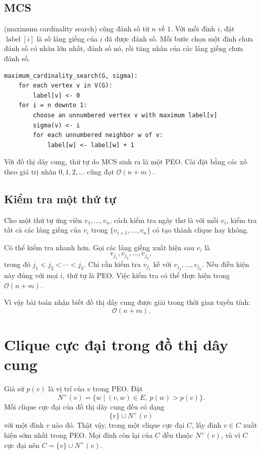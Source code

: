 \documentclass[11pt]{article}
\newcommand{\Oh}{\mathcal{O}}
\begin{document}
\subsection{MCS}

 (maximum cardinality search) cũng đánh số từ \(n\) về \(1\). Với
mỗi đỉnh \(i\), đặt \(\operatorname{label}[i]\) là số láng giềng của \(i\) đã
được đánh số. Mỗi bước chọn một đỉnh chưa đánh số có nhãn lớn nhất, đánh số
nó, rồi tăng nhãn của các láng giềng chưa đánh số.

\begin{verbatim}
maximum_cardinality_search(G, sigma):
    for each vertex v in V(G):
        label[v] <- 0
    for i = n downto 1:
        choose an unnumbered vertex v with maximum label[v]
        sigma(v) <- i
        for each unnumbered neighbor w of v:
            label[w] <- label[w] + 1
\end{verbatim}

Với đồ thị dây cung, thứ tự do MCS sinh ra là một PEO. Cài đặt bằng các xô
theo giá trị nhãn \(0,1,2,\ldots\) cũng đạt \(\Oh(n+m)\).

\subsection{Kiểm tra một thứ tự}

Cho một thứ tự ứng viên \(v_1,\ldots,v_n\), cách kiểm tra ngây thơ là với
mỗi \(v_i\), kiểm tra tất cả các láng giềng của \(v_i\) trong
\(\{v_{i+1},\ldots,v_n\}\) có tạo thành clique hay không.

Có thể kiểm tra nhanh hơn. Gọi các láng giềng xuất hiện sau \(v_i\) là
\[
  v_{j_1},v_{j_2},\ldots,v_{j_k},
\]
trong đó \(j_1<j_2<\cdots<j_k\). Chỉ cần kiểm tra \(v_{j_1}\) kề với
\(v_{j_2},\ldots,v_{j_k}\). Nếu điều kiện này đúng với mọi \(i\), thứ tự là
PEO. Việc kiểm tra có thể thực hiện trong \(\Oh(n+m)\).

Vì vậy bài toán nhận biết đồ thị dây cung được giải trong thời gian tuyến
tính:
\[
  \Oh(n+m).
\]

\section{Clique cực đại trong đồ thị dây cung}

Giả sử \(p(v)\) là vị trí của \(v\) trong PEO. Đặt
\[
  N^+(v)=\{w\mid (v,w)\in E,\ p(w)>p(v)\}.
\]
Mỗi clique cực đại của đồ thị dây cung đều có dạng
\[
  \{v\}\cup N^+(v)
\]
với một đỉnh \(v\) nào đó. Thật vậy, trong một clique cực đại \(C\), lấy đỉnh
\(v\in C\) xuất hiện sớm nhất trong PEO. Mọi đỉnh còn lại của \(C\) đều thuộc
\(N^+(v)\), và vì \(C\) cực đại nên \(C=\{v\}\cup N^+(v)\).
\end{document}
